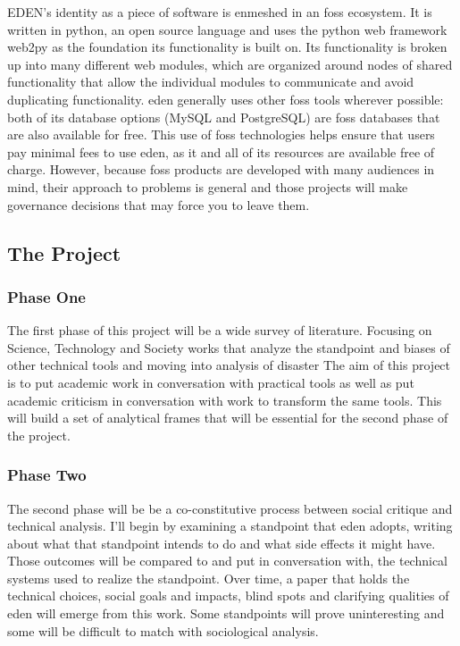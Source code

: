 \documentclass[a4paper,man,natbib]{apa6}
\begin{document}
   EDEN's identity as a piece of software is enmeshed in an \acrshort{foss} ecosystem. It is written in \Gls{python}, an open source language and uses the \Gls{python} \gls{web framework} web2py as the foundation its functionality is built on. Its functionality is broken up into many different web modules, which are organized around nodes of shared functionality that allow the individual modules to communicate and avoid duplicating functionality. \acrshort{eden} generally uses other \acrshort{foss} tools wherever possible: both of its database options (\Gls{MySQL} and \Gls{PostgreSQL}) are \acrshort{foss} databases that are also available for free. This use of \acrlong{foss} technologies helps ensure that users pay minimal fees to use \acrshort{eden}, as it and all of its resources are available free of charge. However, because \acrshort{foss} products are developed with many audiences in mind, their approach to problems is general and those projects will make governance decisions that may force you to leave them.

   \subsection*{The Project}
   \subsubsection*{Phase One}
   The first phase of this project will be a wide survey of literature. Focusing on Science, Technology and Society works that analyze the standpoint and biases of other technical tools and moving into analysis of disaster 
   The aim of this project is to put academic work in conversation with practical tools as well as put academic criticism in conversation with work to transform the same tools. This will build a set of analytical frames that will be essential for the second phase of the project.  
   \subsubsection*{Phase Two}
   The second phase will be be a co-constitutive process between social critique and technical analysis. I'll begin by examining a standpoint that \acrshort{eden} adopts, writing about what that standpoint intends to do and what side effects it might have. Those outcomes will be compared to and put in conversation with, the technical systems used to realize the standpoint. Over time, a paper that holds the technical choices, social goals and impacts, blind spots and clarifying qualities of \acrshort{eden} will emerge from this work. Some standpoints will prove uninteresting and some will be difficult to match with sociological analysis. 
\end{document}
